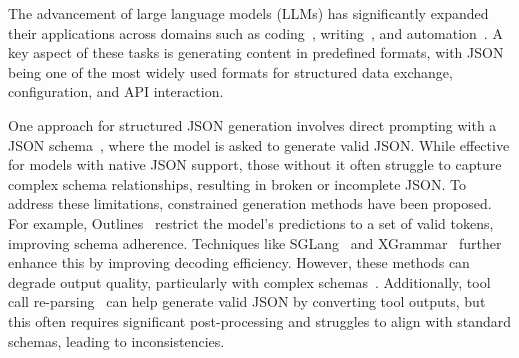 


The advancement of large language models (LLMs) has significantly expanded their applications across domains such as coding~\citep{nam2024using}, writing~\citep{pal2024ai}, and automation~\citep{zhu2023autogen}. A key aspect of these tasks is generating content in predefined formats, with JSON being one of the most widely used formats for structured data exchange, configuration, and API interaction.


One approach for structured JSON generation involves direct prompting with a JSON schema~\citep{pokrass2023structured}, where the model is asked to generate valid JSON. While effective for models with native JSON support, those without it often struggle to capture complex schema relationships, resulting in broken or incomplete JSON.
To address these limitations, constrained generation methods have been proposed. For example, Outlines~\citep{willard2023efficient} restrict the model’s predictions to a set of valid tokens, improving schema adherence. Techniques like SGLang~\citep{zheng2024sglangefficientexecutionstructured} and XGrammar~\citep{dong2024xgrammarflexibleefficientstructured} further enhance this by improving decoding efficiency. However, these methods can degrade output quality, particularly with complex schemas~\citep{tam2024let, he2024doespromptformattingimpact}.
Additionally, tool call re-parsing~\citep{schick2023toolformer, qin2023tool, qin2023toolllm, qian2023toolink} can help generate valid JSON by converting tool outputs, but this often requires significant post-processing and struggles to align with standard schemas, leading to inconsistencies.

